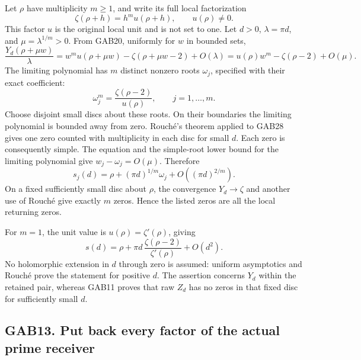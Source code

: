 \documentclass[
  10pt,
  a4paper,
]{article}
\begin{document}
Let \(\rho\) have multiplicity \(m\ge1\), and write its full local
factorization \[
 \zeta(\rho+h)=h^m u(\rho+h),\qquad u(\rho)\ne0.
\] This factor \(u\) is the original local unit and is not set to one.
Let \(d>0\), \(\lambda=\pi d\), and \(\mu=\lambda^{1/m}>0\). From GAB20,
uniformly for \(w\) in bounded sets, \[
 \frac{Y_d(\rho+\mu w)}{\lambda}
   =w^m u(\rho+\mu w)-\zeta(\rho+\mu w-2)+O(\lambda)
   =u(\rho)w^m-\zeta(\rho-2)+O(\mu).                   \tag{GAB28}
\] The limiting polynomial has \(m\) distinct nonzero roots
\(\omega_j\), specified with their exact coefficient: \[
 \omega_j^m=\frac{\zeta(\rho-2)}{u(\rho)},
                 \qquad j=1,\ldots,m.                 \tag{GAB29}
\] Choose disjoint small discs about these roots. On their boundaries
the limiting polynomial is bounded away from zero. Rouché's theorem
applied to GAB28 gives one zero counted with multiplicity in each disc
for small \(d\). Each zero is consequently simple. The equation and the
simple-root lower bound for the limiting polynomial give
\(w_j-\omega_j=O(\mu)\). Therefore \[
 \boxed{\displaystyle
 s_j(d)=\rho+(\pi d)^{1/m}\omega_j
                    +O((\pi d)^{2/m}).}               \tag{GAB30}
\] On a fixed sufficiently small disc about \(\rho\), the convergence
\(Y_d\to\zeta\) and another use of Rouché give exactly \(m\) zeros.
Hence the listed zeros are all the local returning zeros.

For \(m=1\), the unit value is \(u(\rho)=\zeta'(\rho)\), giving \[
 s(d)=\rho+\pi d\,\frac{\zeta(\rho-2)}{\zeta'(\rho)}
                       +O(d^2).                      \tag{GAB31}
\] No holomorphic extension in \(d\) through zero is assumed: uniform
asymptotics and Rouché prove the statement for positive \(d\). The
assertion concerns \(Y_d\) within the retained pair, whereas GAB11
proves that raw \(Z_d\) has no zeros in that fixed disc for sufficiently
small \(d\).

\subsection{GAB13. Put back every factor of the actual prime
receiver}\label{gab13.-put-back-every-factor-of-the-actual-prime-receiver}
\end{document}
